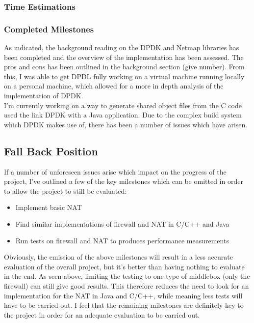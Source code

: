 \documentclass[a4paper, titlepage]{article}
\begin{document}
\subsubsection{Time Estimations}

\subsubsection{Completed Milestones}
As indicated, the background reading on the DPDK and Netmap libraries has been completed and the overview of the implementation has been assessed. The pros and cons has been outlined in the background section (give number). From this, I was able to get DPDL fully working on a virtual machine running locally on a personal machine, which allowed for a more in depth analysis of the implementation of DPDK. \\
\newline
I'm currently working on a way to generate shared object files from the C code used the link DPDK with a Java application. Due to the complex build system which DPDK makes use of, there has been a number of issues which have arisen.

\subsection{Fall Back Position}
If a number of unforeseen issues arise which impact on the progress of the project, I've outlined a few of the key milestones which can be omitted in order to allow the project to still be evaluated:
\begin{itemize}
	\item Implement basic NAT
	\item Find similar implementations of firewall and NAT in C/C++ and Java
	\item Run tests on firewall and NAT to produces performance measurements
\end{itemize}
Obviously, the emission of the above milestones will result in a less accurate evaluation of the overall project, but it's better than having nothing to evaluate in the end. As seen above, limiting the testing to one type of middlebox (only the firewall) can still give good results. This therefore reduces the need to look for an implementation for the NAT in Java and C/C++, while meaning less tests will have to be carried out. I feel that the remaining milestones are definitely key to the project in order for an adequate evaluation to be carried out.
\end{document}
